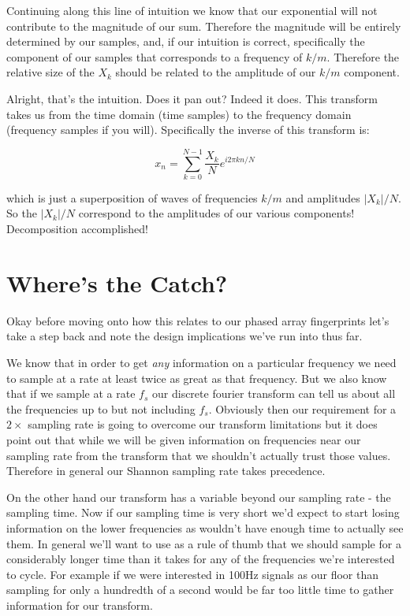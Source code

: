 \documentclass[10pt,a5paper]{book}
\begin{document}
Continuing along this line of intuition we know that our exponential will not contribute to the magnitude of our sum. Therefore the magnitude will be entirely determined by our samples, and, if our intuition is correct, specifically the component of our samples that corresponds to a frequency of $k/m$. Therefore the relative size of the $X_k$ should be related to the amplitude of our $k/m$ component. 

Alright, that's the intuition. Does it pan out? Indeed it does. This transform takes us from the time domain (time samples) to the frequency domain (frequency samples if you will). Specifically the inverse of this transform is:

\begin{equation}
x_n = \sum_{k=0}^{N-1}\frac{X_k}{N} e^{i2\pi kn/N}
\end{equation}

which is just a superposition of waves of frequencies $k/m$ and amplitudes $|X_k|/N$. So the $|X_k|/N$ correspond to the amplitudes of our various components! Decomposition accomplished!

\section{Where's the Catch?}
Okay before moving onto how this relates to our phased array fingerprints let's take a step back and note the design implications we've run into thus far. 

We know that in order to get \textit{any} information on a particular frequency we need to sample at a rate at least twice as great as that frequency. But we also know that if we sample at a rate $f_s$ our discrete fourier transform can tell us about all the frequencies up to but not including $f_s$. Obviously then our requirement for a $2\times$ sampling rate is going to overcome our transform limitations but it does point out that while we will be given information on frequencies near our sampling rate from the transform that we shouldn't actually trust those values. Therefore in general our Shannon sampling rate takes precedence.

On the other hand our transform has a variable beyond our sampling rate - the sampling time. Now if our sampling time is very short we'd expect to start losing information on the lower frequencies as wouldn't have enough time to actually see them. In general we'll want to use as a rule of thumb that we should sample for a considerably longer time than it takes for any of the frequencies we're interested to cycle. For example if we were interested in 100Hz signals as our floor than sampling for only a hundredth of a second would be far too little time to gather information for our transform. 
\end{document}
